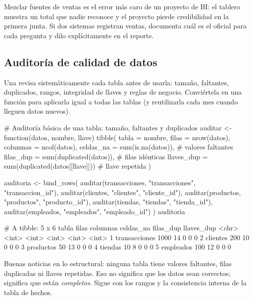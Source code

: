 \begin{advertencia}
Mezclar fuentes de ventas es el error más caro de un proyecto de BI: el
tablero muestra un total que nadie reconoce y el proyecto pierde credibilidad
en la primera junta. Si dos sistemas registran ventas, documenta cuál es el
oficial para cada pregunta y dilo explícitamente en el reporte.
\end{advertencia}

\subsection{Auditoría de calidad de datos}
\label{sec:m09-auditoria}

Una  revisa sistemáticamente cada tabla antes
de usarla: tamaño, faltantes, duplicados, rangos, integridad de llaves y
reglas de negocio. Conviértela en una función para aplicarla igual a todas
las tablas (y reutilizarla cada mes cuando lleguen datos nuevos).

\begin{rcode}
# Auditoría básica de una tabla: tamaño, faltantes y duplicados
auditar <- function(datos, nombre, llave) {
  tibble(
    tabla      = nombre,
    filas      = nrow(datos),
    columnas   = ncol(datos),
    celdas_na  = sum(is.na(datos)),               # valores faltantes
    filas_dup  = sum(duplicated(datos)),          # filas idénticas
    llaves_dup = sum(duplicated(datos[[llave]]))  # llave repetida
  )
}

auditoria <- bind_rows(
  auditar(transacciones, "transacciones", "transaccion_id"),
  auditar(clientes,      "clientes",      "cliente_id"),
  auditar(productos,     "productos",     "producto_id"),
  auditar(tiendas,       "tiendas",       "tienda_id"),
  auditar(empleados,     "empleados",     "empleado_id")
)
auditoria
\end{rcode}

\begin{rsalida}
# A tibble: 5 x 6
  tabla         filas columnas celdas_na filas_dup llaves_dup
  <chr>         <int>    <int>     <int>     <int>      <int>
1 transacciones  1000       14         0         0          0
2 clientes        200       10         0         0          0
3 productos        50       13         0         0          0
4 tiendas          10        8         0         0          0
5 empleados       100       12         0         0          0
\end{rsalida}

Buenas noticias en lo estructural: ninguna tabla tiene valores faltantes,
filas duplicadas ni llaves repetidas. Eso no significa que los datos sean
correctos; significa que están \emph{completos}. Sigue con los rangos y la
consistencia interna de la tabla de hechos.


